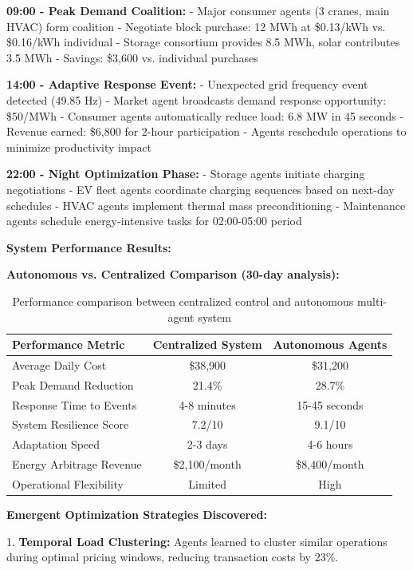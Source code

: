 \documentclass{article}
\begin{document}
\textbf{09:00 - Peak Demand Coalition:}
- Major consumer agents (3 cranes, main HVAC) form coalition
- Negotiate block purchase: 12 MWh at \$0.13/kWh vs. \$0.16/kWh individual
- Storage consortium provides 8.5 MWh, solar contributes 3.5 MWh
- Savings: \$3,600 vs. individual purchases

\textbf{14:00 - Adaptive Response Event:}
- Unexpected grid frequency event detected (49.85 Hz)
- Market agent broadcasts demand response opportunity: \$50/MWh
- Consumer agents automatically reduce load: 6.8 MW in 45 seconds
- Revenue earned: \$6,800 for 2-hour participation
- Agents reschedule operations to minimize productivity impact

\textbf{22:00 - Night Optimization Phase:}
- Storage agents initiate charging negotiations
- EV fleet agents coordinate charging sequences based on next-day schedules
- HVAC agents implement thermal mass preconditioning
- Maintenance agents schedule energy-intensive tasks for 02:00-05:00 period

\textbf{System Performance Results:}

\textbf{Autonomous vs. Centralized Comparison (30-day analysis):}

\begin{table}[htbp]
\centering
\begin{tabular}{lcc}
\toprule
\textbf{Performance Metric} & \textbf{Centralized System} & \textbf{Autonomous Agents} \\
\midrule
Average Daily Cost & \$38,900 & \$31,200 \\
Peak Demand Reduction & 21.4\% & 28.7\% \\
Response Time to Events & 4-8 minutes & 15-45 seconds \\
System Resilience Score & 7.2/10 & 9.1/10 \\
Adaptation Speed & 2-3 days & 4-6 hours \\
Energy Arbitrage Revenue & \$2,100/month & \$8,400/month \\
Operational Flexibility & Limited & High \\
\bottomrule
\end{tabular}
\caption{Performance comparison between centralized control and autonomous multi-agent system}
\end{table}

\textbf{Emergent Optimization Strategies Discovered:}

1. \textbf{Temporal Load Clustering:} Agents learned to cluster similar operations during optimal pricing windows, reducing transaction costs by 23\%.
\end{document}
